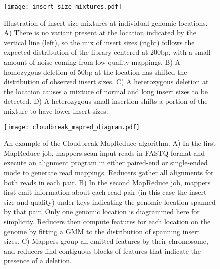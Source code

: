\documentclass[11pt]{article}
\begin{document}
\printbibliography


\setcounter{table}{0}
\setcounter{figure}{0}
\renewcommand{\figurename}{Supplementary Figure}
\renewcommand{\tablename}{Supplementary Table}


\newrefsection


\begin{figure}
\centering
\texttt{[image: insert\_size\_mixtures.pdf]}
\caption{Illustration of insert size mixtures at individual genomic locations. A) There is no variant present at the location indicated by the vertical line (left), so the mix of insert sizes (right) follows the expected distribution of the library centered at 200bp, with a small amount of noise coming from low-quality mappings. B) A homozygous deletion of 50bp at the location has shifted the distribution of observed insert sizes. C) A heterozygous deletion at the location causes a mixture of normal and long insert sizes to be detected. D) A heterozygous small insertion shifts a portion of the mixture to have lower insert sizes.}
\label{insert_size_mixes}
\end{figure}

\clearpage

\begin{figure}[h]
\centering
\texttt{[image: cloudbreak\_mapred\_diagram.pdf]}
\caption{An example of the Cloudbreak MapReduce algorithm. A) In the first MapReduce job, mappers scan input reads in FASTQ format and execute an alignment program in either paired-end or single-ended mode to generate read mappings. Reducers gather all alignments for both reads in each pair. B) In the second MapReduce job, mappers first emit information about each read pair (in this case the insert size and quality) under keys indicating the genomic location spanned by that pair. Only one genomic location is diagrammed here for simplicity. Reducers then compute features for each location on the genome by fitting a GMM to the distribution of spanning insert sizes. C) Mappers group all emitted features by their chromosome, and reducers find contiguous blocks of features that indicate the presence of a deletion.}
\label{algorithm_example}
\end{figure}

\clearpage
\end{document}
